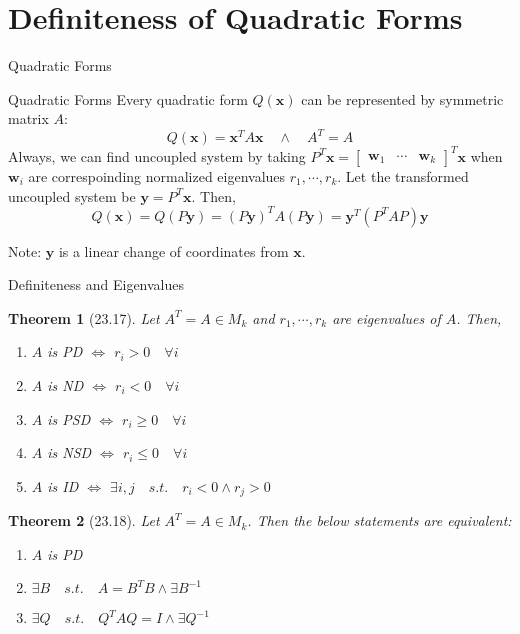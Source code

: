 \documentclass[a4paper,11pt]{article}
\newtheorem{thm}{Theorem}
\newcommand{\bd}{\mathbf}
\begin{document}
\section{Definiteness of Quadratic Forms} %
\label{sec:definiteness_of_quadratic_forms}
\begin{frame}[t]{Quadratic Forms}
	\begin{block}
		{Quadratic Forms} Every quadratic form $Q(\bd{x})$ can be represented by symmetric matrix $A$:\[
			Q(\bd{x}) = \bd{x}^T A \bd{x}\quad\land\quad A^T = A
		\]Always, we can find uncoupled system by taking $P^T \bd{x}=\begin{bmatrix}
			\bd{w}_1&\cdots&\bd{w}_k
		\end{bmatrix}^T\bd{x}$ when $\bd{w}_i$ are correspoinding normalized eigenvalues $r_1,\cdots,r_k$.
		Let the transformed uncoupled system be $\bd{y}=P^T\bd{x}$. Then, \[
			Q(\bd{x}) = Q(P\bd{y}) = (P\bd{y})^TA(P\bd{y})= \bd{y}^T (P^TAP)\bd{y}
		\]
	\end{block}
	Note: $\bd{y}$ is a linear change of coordinates from $\bd{x}$.
\end{frame}

\begin{frame}[t]{Definiteness and Eigenvalues}
	\begin{thm}
		[23.17] Let $A^T=A\in M_k$ and $r_1,\cdots,r_k$ are eigenvalues of $A$. Then,
		\begin{enumerate}
			\item $A$ is PD $\iff$ $r_i>0\quad \forall i$
			\item $A$ is ND $\iff$ $r_i<0\quad \forall i$
			\item $A$ is PSD $\iff$ $r_i\ge 0\quad \forall i$
			\item $A$ is NSD $\iff$ $r_i\le 0\quad \forall i$
			\item $A$ is ID $\iff$ $\exists i,j \quad s.t. \quad  r_i<0 \land  r_j>0 $
		\end{enumerate}
	\end{thm}
	\begin{thm}
		[23.18]
		Let $A^T=A\in M_k$. Then the below statements are equivalent:
		\begin{enumerate}
			\item $A$ is PD
			\item $\exists B\quad s.t. \quad A=B^TB\land \exists B^{-1}$
			\item $\exists Q\quad s.t. \quad Q^TAQ=I\land\exists Q^{-1}$
		\end{enumerate}
	\end{thm}
\end{frame}
\end{document}

